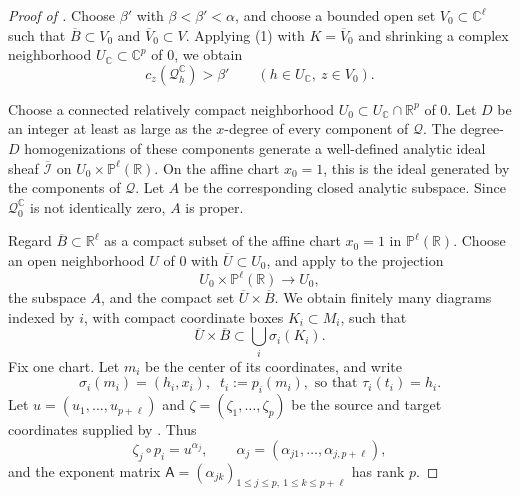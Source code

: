 \documentclass[reqno,11pt]{amsart}
\numberwithin{equation}{section}
\theoremstyle{definition}
\theoremstyle{remark}
\begin{document}
\begin{proof}[Proof of ]
Choose $\beta'$ with $\beta<\beta'<\alpha$, and choose a bounded
open set $V_0\subset\mathbb C^\ell$ such that
$\overline B\subset V_0$ and $\overline V_0\subset V$.
Applying \textnormal{(1)} with
$K=\overline V_0$ and shrinking a complex neighborhood
$U_{\mathbb C}\subset\mathbb C^p$ of $0$, we obtain
\begin{equation}\label{eq:nearby-complex-threshold}
c_z(\mathcal Q_h^{\mathbb C})>\beta'
\qquad
(h\in U_{\mathbb C},\ z\in V_0).
\end{equation}

Choose a connected relatively compact neighborhood
$U_0\subset U_{\mathbb C}\cap\mathbb R^p$ of $0$. Let $D$ be an integer at least as large as the
$x$-degree of every component of $\mathcal Q$. The degree-$D$
homogenizations of these components generate a well-defined analytic ideal
sheaf $\overline{\mathcal I}$ on
$U_0\times\mathbb P^\ell(\mathbb R).$
On the affine chart $x_0=1$, this is the ideal generated by the components
of $\mathcal Q$. Let $A$ be the corresponding closed analytic
subspace. Since $\mathcal Q_0^{\mathbb C}$ is not identically zero,
$A$ is proper.

Regard $\overline B\subset\mathbb R^\ell$ as a compact subset of the
affine chart $x_0=1$ in $\mathbb P^\ell(\mathbb R)$.
Choose an open neighborhood $U$ of $0$ with $\overline U\subset U_0$, and
apply  to the projection
$$
U_0\times\mathbb P^\ell(\mathbb R)\to U_0,
$$
the subspace $A$, and the compact set
$\overline U\times\overline B$. We obtain finitely many diagrams indexed by
$i$, with compact coordinate boxes $K_i\subset M_i$, such that
$$
\overline U\times\overline B
\subset
\bigcup_i\sigma_i(K_i).
$$
Fix one chart. Let $m_i$ be the center of its coordinates, and write
$$
\sigma_i(m_i)=(h_i,x_i),
\;\;
t_i:=p_i(m_i), \text{ so that $\tau_i(t_i)=h_i$.}
$$
 Let
$ u=(u_1,\ldots,u_{p+\ell})$ and $\zeta=(\zeta_1,\ldots,\zeta_p)$
be the source and target coordinates supplied by
. Thus
\begin{equation}\label{eq:parameter-monomials-in-proof}
\zeta_j\circ p_i=u^{\alpha_j},
\qquad
\alpha_j=(\alpha_{j1},\ldots,\alpha_{j,p+\ell}),
\end{equation}
and the exponent matrix
$\mathsf A=(\alpha_{jk})_{1\le j\le p,\ 1\le k\le p+\ell}$ has rank $p$.


\end{proof}
\end{document}
